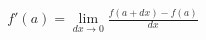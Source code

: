 \documentclass[preview]{standalone}
\begin{document}
\begin{align*}
f'(a)= \lim_{dx \to 0} \frac{f(a+dx) - f(a)}{dx}
\end{align*}
\end{document}
